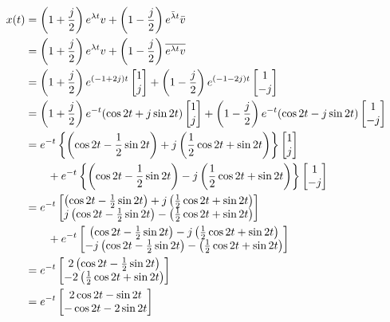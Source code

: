 \documentclass[12pt,a4paper]{article}
\begin{document}
\begin{align*}
	x(t) &= \left(1 + {j\over2}\right) e^{\lambda t} v + \left(1 - {j \over 2}\right) e^{\bar \lambda t} \bar v \\
	&= \left(1 + {j\over2}\right) e^{\lambda t} v + \left(1 - {j \over 2}\right) \overline  {e^{\lambda t}  v} \\
	&= \left( 1 + {j\over 2} \right) e^{(-1 + 2j)t} \begin{bmatrix}
		1 \\ j
	\end{bmatrix} + \left(1 - {j\over 2}\right) e^{(-1 - 2j)t} \begin{bmatrix}
	1 \\ -j
	\end{bmatrix} \\
	&= \left( 1 + {j\over 2} \right)e^{-t}(\cos2t + j\sin2t) \begin{bmatrix}
		1 \\ j
	\end{bmatrix} + \left(1 - {j\over 2}\right)e^{-t} (\cos 2t - j\sin 2t) \begin{bmatrix}
		1 \\ -j
	\end{bmatrix} \\
	&= e^{-t} \left\{ \left(\cos 2t - {1\over2} \sin 2t\right) + j \left( {1\over 2} \cos 2t + \sin 2t\right) \right\} \begin{bmatrix}
		1 \\ j
	\end{bmatrix} \\
	&\qquad + e^{-t} \left\{ \left(\cos 2t - {1\over2} \sin 2t\right) - j \left( {1\over 2} \cos 2t + \sin 2t\right) \right\} \begin{bmatrix}
		1 \\ -j
	\end{bmatrix} \\
	&= e^{-t} \begin{bmatrix}
		\left(\cos 2t - {1\over2} \sin 2t\right) + j \left( {1\over 2} \cos 2t + \sin 2t\right) \\
		j\left(\cos 2t - {1\over2} \sin 2t\right) - \left( {1\over 2} \cos 2t + \sin 2t\right)
	\end{bmatrix} \\
	&\qquad + e^{-t} \begin{bmatrix}
		\left(\cos 2t - {1\over2} \sin 2t\right) - j \left( {1\over 2} \cos 2t + \sin 2t\right) \\
		-j\left(\cos 2t - {1\over2} \sin 2t\right) - \left( {1\over 2} \cos 2t + \sin 2t\right)
	\end{bmatrix} \\
	&= e^{-t} \begin{bmatrix}
		2 \left(\cos 2t - {1\over2} \sin 2t\right) \\
		-2 \left( {1\over 2} \cos 2t + \sin 2t\right)
	\end{bmatrix} \\
	&= e^{-t} \begin{bmatrix}
		2\cos 2t - \sin 2t \\
		-\cos 2t - 2\sin 2t
	\end{bmatrix}
	\end{align*}
	
\end{document}
